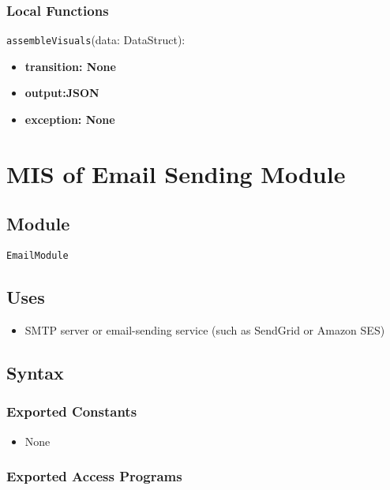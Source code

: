 \documentclass[12pt, titlepage]{article}
\begin{document}
\subsubsection{Local Functions}
 \noindent \texttt{assembleVisuals}(data: DataStruct):
\begin{itemize}
    \item \textbf{transition: None} 
    \item \textbf{output:JSON} 
    \item \textbf{exception: None}
\end{itemize}



\section{MIS of Email Sending Module} \label{EmailModule}

\subsection{Module}

\texttt{EmailModule}

\subsection{Uses}

\begin{itemize}
    \item SMTP server or email-sending service (such as SendGrid or Amazon SES)
\end{itemize}

\subsection{Syntax}

\subsubsection{Exported Constants}

\begin{itemize}
    \item None
\end{itemize}

\subsubsection{Exported Access Programs}
\end{document}
